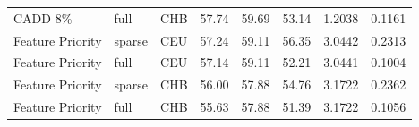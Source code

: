 \documentclass[11pt]{article}
\begin{document}
\begin{table}
\begin{tabular}{lll|crr|cc}
          CADD 8\% &              full &          CHB &                        57.74 &             59.69 &            53.14 &                                 1.2038 &                                0.1161 \\
  Feature Priority &            sparse &          CEU &                        57.24 &             59.11 &            56.35 &                                 3.0442 &                                0.2313 \\
  Feature Priority &              full &          CEU &                        57.14 &             59.11 &            52.21 &                                 3.0441 &                                0.1004 \\
  Feature Priority &            sparse &          CHB &                        56.00 &             57.88 &            54.76 &                                 3.1722 &                                0.2362 \\
  Feature Priority &              full &          CHB &                        55.63 &             57.88 &            51.39 &                                 3.1722 &                                0.1056 \\
\end{tabular}
\end{table}
\end{document}
